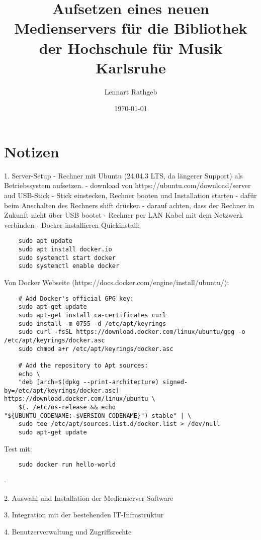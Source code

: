 \documentclass[12pt,a4paper]{article}
\title{Aufsetzen eines neuen Medienservers für die Bibliothek der Hochschule für Musik Karlsruhe}
\author{Lennart Rathgeb}
\date{\today}
\begin{document}
\maketitle

\tableofcontents
\newpage

\section{Notizen}
1. Server-Setup
- Rechner mit Ubuntu (24.04.3 LTS, da längerer Support) als Betriebssystem aufsetzen.
    - download von https://ubuntu.com/download/server aud USB-Stick
    - Stick einstecken, Rechner booten und Installation starten
        - dafür beim Anschalten des Rechners shift drücken
        - darauf achten, dass der Rechner in Zukunft nicht über USB bootet
        - Rechner per LAN Kabel mit dem Netzwerk verbinden
- Docker installieren
    Quickinstall:
    \begin{verbatim}
    sudo apt update
    sudo apt install docker.io
    sudo systemctl start docker
    sudo systemctl enable docker
    \end{verbatim}
    Von Docker Webseite (https://docs.docker.com/engine/install/ubuntu/):
    \begin{verbatim}
    # Add Docker's official GPG key:
    sudo apt-get update
    sudo apt-get install ca-certificates curl
    sudo install -m 0755 -d /etc/apt/keyrings
    sudo curl -fsSL https://download.docker.com/linux/ubuntu/gpg -o /etc/apt/keyrings/docker.asc
    sudo chmod a+r /etc/apt/keyrings/docker.asc

    # Add the repository to Apt sources:
    echo \
    "deb [arch=$(dpkg --print-architecture) signed-by=/etc/apt/keyrings/docker.asc] https://download.docker.com/linux/ubuntu \
    $(. /etc/os-release && echo "${UBUNTU_CODENAME:-$VERSION_CODENAME}") stable" | \
    sudo tee /etc/apt/sources.list.d/docker.list > /dev/null
    sudo apt-get update
    \end{verbatim}
    
    Test mit:
    \begin{verbatim} 
    sudo docker run hello-world 
    \end{verbatim}
- 


2. Auswahl und Installation der Medienserver-Software

3. Integration mit der bestehenden IT-Infrastruktur

4. Benutzerverwaltung und Zugriffsrechte
\end{document}

